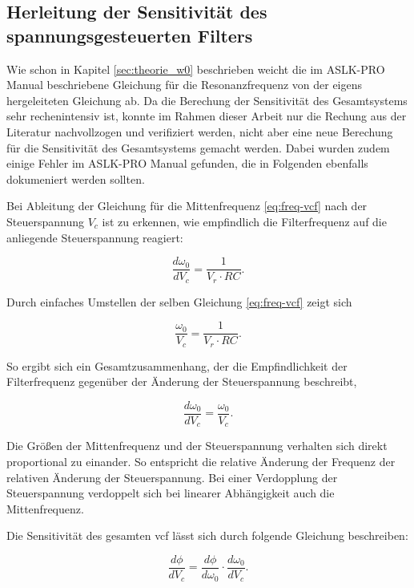 \documentclass[../main.tex]{subfiles}
\begin{document}
\subsection{Herleitung der Sensitivität des spannungsgesteuerten Filters}
Wie schon in Kapitel \ref{sec:theorie_w0} beschrieben weicht die im ASLK-PRO Manual beschriebene Gleichung für die Resonanzfrequenz von der eigens hergeleiteten Gleichung ab. Da die Berechung der Sensitivität des Gesamtsystems sehr rechenintensiv ist, konnte im Rahmen dieser Arbeit nur die Rechung aus der Literatur nachvollzogen und verifiziert werden, nicht aber eine neue Berechung für die Sensitivität des Gesamtsystems gemacht werden. Dabei wurden zudem einige Fehler im ASLK-PRO Manual gefunden, die in Folgenden ebenfalls dokumeniert werden sollten.\par
\medskip

Bei Ableitung der Gleichung für die Mittenfrequenz \eqref{eq:freq-vcf} nach der Steuerspannung $V_c$ ist zu erkennen, wie empfindlich die Filterfrequenz auf die anliegende Steuerspannung reagiert:

\begin{equation*}
\frac{d \omega_0}{d V_c} = \frac{1}{V_r \cdot RC}.
\end{equation*}

Durch einfaches Umstellen der selben Gleichung \eqref{eq:freq-vcf} zeigt sich

\begin{equation*}
\frac{\omega_0}{V_c} = \frac{1}{V_r \cdot RC}.
\end{equation*}

So ergibt sich ein Gesamtzusammenhang, der die Empfindlichkeit der Filterfrequenz gegenüber der Änderung der Steuerspannung beschreibt,

\begin{equation}
\frac{d \omega_0}{d V_c} =  \frac{\omega_0}{V_c} \label{eq:empf_w0-Vc}.
\end{equation}

Die Größen der Mittenfrequenz und der Steuerspannung verhalten sich direkt proportional zu einander. So entspricht die relative Änderung der Frequenz der relativen Änderung der Steuerspannung. Bei einer Verdopplung der Steuerspannung verdoppelt sich bei linearer Abhängigkeit auch die Mittenfrequenz.\par
\medskip


Die Sensitivität des gesamten \gls{vcf} lässt sich durch folgende Gleichung beschreiben:

\begin{equation}
\frac{d \phi}{d V_c} = \frac{d \phi}{d \omega_0} \cdot \frac{d \omega_0}{d V_c}. \label{eq:ges-sensitivität}
\end{equation}
\end{document}
